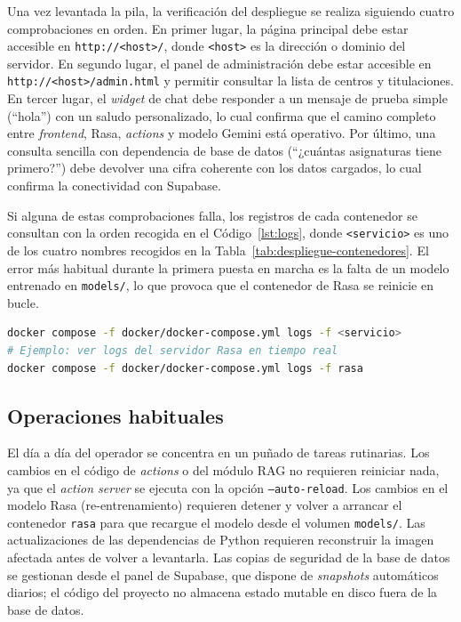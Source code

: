 Una vez levantada la pila, la verificación del despliegue se realiza siguiendo cuatro comprobaciones en orden. En primer lugar, la página principal debe estar accesible en \texttt{http://<host>/}, donde \texttt{<host>} es la dirección o dominio del servidor. En segundo lugar, el panel de administración debe estar accesible en \texttt{http://<host>/admin.html} y permitir consultar la lista de centros y titulaciones. En tercer lugar, el \textit{widget} de chat debe responder a un mensaje de prueba simple (``hola'') con un saludo personalizado, lo cual confirma que el camino completo entre \textit{frontend}, Rasa, \textit{actions} y modelo Gemini está operativo. Por último, una consulta sencilla con dependencia de base de datos (``¿cuántas asignaturas tiene primero?'') debe devolver una cifra coherente con los datos cargados, lo cual confirma la conectividad con Supabase.

Si alguna de estas comprobaciones falla, los registros de cada contenedor se consultan con la orden recogida en el Código~\ref{lst:logs}, donde \texttt{<servicio>} es uno de los cuatro nombres recogidos en la Tabla~\ref{tab:despliegue-contenedores}. El error más habitual durante la primera puesta en marcha es la falta de un modelo entrenado en \texttt{models/}, lo que provoca que el contenedor de Rasa se reinicie en bucle.

\begin{lstlisting}[language=bash, caption={Consultar registros de un contenedor.}, label={lst:logs}]
docker compose -f docker/docker-compose.yml logs -f <servicio>
# Ejemplo: ver logs del servidor Rasa en tiempo real
docker compose -f docker/docker-compose.yml logs -f rasa
\end{lstlisting}

\subsection{Operaciones habituales}\label{subsec:despliegue-operaciones}

El día a día del operador se concentra en un puñado de tareas rutinarias. Los cambios en el código de \textit{actions} o del módulo RAG no requieren reiniciar nada, ya que el \textit{action server} se ejecuta con la opción \texttt{--auto-reload}. Los cambios en el modelo Rasa (re-entrenamiento) requieren detener y volver a arrancar el contenedor \texttt{rasa} para que recargue el modelo desde el volumen \texttt{models/}. Las actualizaciones de las dependencias de Python requieren reconstruir la imagen afectada antes de volver a levantarla. Las copias de seguridad de la base de datos se gestionan desde el panel de Supabase, que dispone de \textit{snapshots} automáticos diarios; el código del proyecto no almacena estado mutable en disco fuera de la base de datos.

